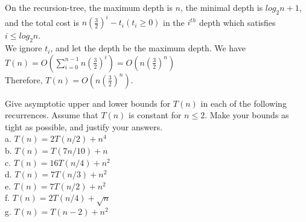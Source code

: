 \documentclass[a4paper, justified]{tufte-handout}
\begin{document}
\begin{problem}[TC 4.5-4]
\end{problem}

\begin{solution}
  On the  recursion-tree, the maximum depth is  $n$, the minimal depth is $log_2{n}+1$, and the total cost is  $n(\frac{3}{2})^i-t_i(t_i\geq 0)$  in the $i^{th}$ depth which satisfies $i\leq log_2{n}$.\\
  We ignore $t_i$, and let the depth be the maximum depth. We have\\
  $T(n)=O(\sum\limits_{i=0}^{n-1}n(\frac{3}{2})^i)=O(n(\frac{3}{2})^n)$\\
  Therefore, $T(n)=O(n(\frac{3}{2})^n)$.
\end{solution}

\begin{problem}[TC Problem 4-1]
Give asymptotic upper and lower bounds for $T(n)$ in each of the following recurrences. Assume that $T(n)$ is constant for $n \leq 2 .$ Make your bounds as tight as possible, and justify your answers.\\
a. $T(n)=2 T(n / 2)+n^{4}$\\
b. $T(n)=T(7 n / 10)+n$\\
c. $T(n)=16 T(n / 4)+n^{2}$\\
d. $T(n)=7 T(n / 3)+n^{2}$\\
e. $T(n)=7 T(n / 2)+n^{2}$\\
f.  $T(n)=2 T(n / 4)+\sqrt{n}$\\
g. $T(n)=T(n-2)+n^{2}$
\end{problem}
\end{document}
